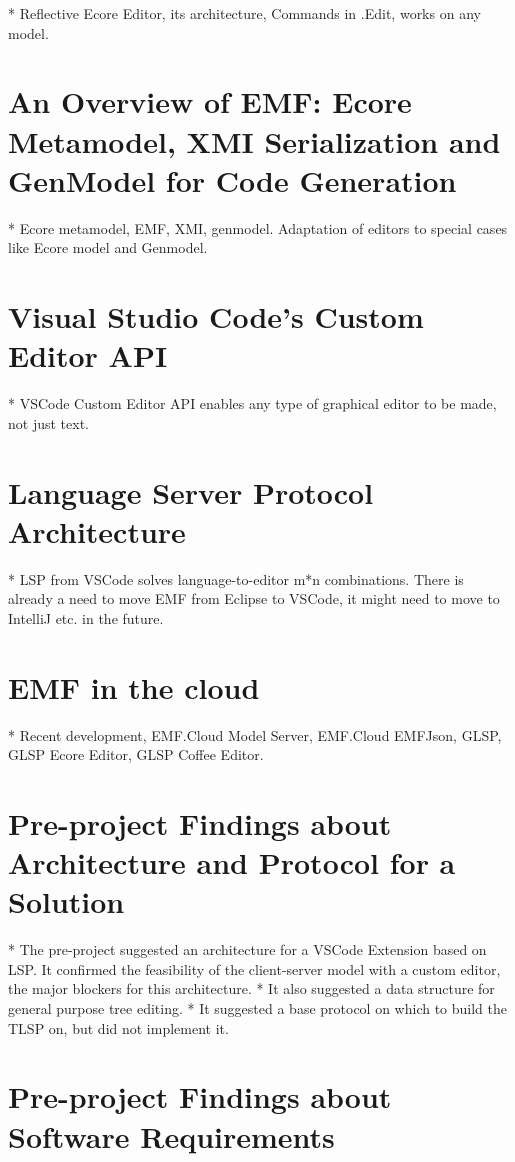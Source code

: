 * Reflective Ecore Editor, its architecture, Commands in .Edit, works on any model.

\section{An Overview of EMF: Ecore Metamodel, XMI Serialization and GenModel for Code Generation}\label{sec:emf-metamodel}

* Ecore metamodel, EMF, XMI, genmodel. Adaptation of editors to special cases like Ecore model and Genmodel.

\section{Visual Studio Code's Custom Editor API}

* VSCode Custom Editor API enables any type of graphical editor to be made, not just text.

\section{Language Server Protocol Architecture}

* LSP from VSCode solves language-to-editor m*n combinations. There is already a need to move EMF from Eclipse to VSCode, it might need to move to IntelliJ etc. in the future.

\section{\acrlong{EMF} in the \Gls{cloud}}

* Recent development, EMF.Cloud Model Server, EMF.Cloud EMFJson, GLSP, GLSP Ecore Editor, GLSP Coffee Editor.

\section{Pre-project Findings about Architecture and Protocol for a Solution}

* The pre-project suggested an architecture for a VSCode Extension based on LSP. It confirmed the feasibility of the client-server model with a custom editor, the major blockers for this architecture.
  * It also suggested a data structure for general purpose tree editing.
  * It suggested a base protocol on which to build the TLSP on, but did not implement it.

\section{Pre-project Findings about Software Requirements}

